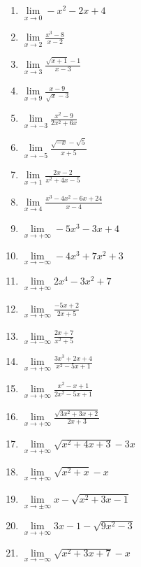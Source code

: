 \documentclass[12pt,a4paper]{article}
\begin{document}
\begin{multicols}{3}
\begin{enumerate}[align=left]
    \item $\displaystyle \lim\limits_{x \to 0} -x^2 - 2x + 4$
    \item $\displaystyle \lim\limits_{x \to 2} \frac{x^3 - 8}{x - 2}$
    \item $\displaystyle \lim\limits_{x \to 3} \frac{\sqrt{x + 1} - 1}{x - 3}$
    \item $\displaystyle \lim\limits_{x \to 9} \frac{x - 9}{\sqrt{x} - 3}$
    \item  $\displaystyle \lim\limits_{x \to -3} \frac{x^{2} - 9}{2x^{2} + 6x}$
    \item $\displaystyle \lim\limits_{x \to -5} \frac{\sqrt{-x} - \sqrt{5}}{x + 5}$
    \item $\displaystyle \lim\limits_{x \to 1} \frac{2x - 2}{x^2 + 4x - 5}$
    \item $\displaystyle \lim\limits_{x \to 4} \frac{x^3 - 4x^2 - 6x + 24}{x - 4}$
    \item $\displaystyle \lim\limits_{x \to +\infty} -5x^3 - 3x + 4$
    \item $\displaystyle \lim\limits_{x \to -\infty} -4x^3 + 7x^2 + 3$
    \item $\displaystyle \lim\limits_{x \to +\infty} 2x^4 - 3x^2 + 7$
    \item $\displaystyle \lim\limits_{x \to +\infty} \frac{-5x + 2}{2x + 5}$
    \item $\displaystyle \lim\limits_{x \to -\infty} \frac{2x + 7}{x^2 + 5}$
    \item $\displaystyle \lim\limits_{x \to +\infty} \frac{3x^3 + 2x + 4}{x^2 - 5x + 1}$
    \item $\displaystyle \lim\limits_{x \to +\infty} \frac{x^2 - x + 1}{2x^2 - 5x + 1}$
    \item $\displaystyle \lim\limits_{x \to +\infty} \frac{\sqrt{3x^2 + 3x + 2}}{2x + 3}$
    \item $\displaystyle \lim\limits_{x \to +\infty} \sqrt{x^2 + 4x + 3} - 3x$
    \item $\displaystyle \lim\limits_{x \to +\infty} \sqrt{x^2 + x} - x$
    \item $\displaystyle \lim\limits_{x \to \pm\infty} x - \sqrt{x^2 + 3x - 1}$
    \item $\displaystyle \lim\limits_{x \to +\infty} 3x - 1 - \sqrt{9x^2 - 3}$
    \item $\displaystyle \lim\limits_{x \to -\infty} \sqrt{x^2 + 3x + 7} - x$

\end{enumerate}
\end{multicols}
\end{document}
